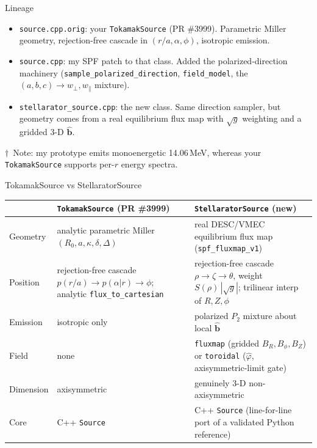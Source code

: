 \documentclass[11pt,aspectratio=169]{beamer}
\newcommand{\bhat}{\hat{\mathbf{b}}}
\newcommand{\notefoot}[1]{\vfill{\footnotesize #1\par}}
\begin{document}
\begin{frame}{Lineage}
\begin{itemize}
\item \texttt{source.cpp.orig}: your \texttt{TokamakSource} (PR \#3999). Parametric
      Miller geometry, rejection-free cascade in $(r/a,\alpha,\phi)$, isotropic emission.
\item \texttt{source.cpp}: my SPF patch to that class. Added the polarized-direction
      machinery (\texttt{sample\_polarized\_direction}, \texttt{field\_model}, the
      $(a,b,c)\!\to\!w_\perp,w_\parallel$ mixture).
\item \texttt{stellarator\_source.cpp}: the new class. Same direction sampler, but geometry
      comes from a real equilibrium flux map with $\sqrt{g}$ weighting and a gridded 3-D
      $\bhat$.
\end{itemize}
\notefoot{$\dagger$~Note: my prototype emits monoenergetic 14.06\,MeV, whereas your
\texttt{TokamakSource} supports per-$r$ energy spectra.}
\end{frame}

\begin{frame}{TokamakSource vs StellaratorSource}
\scriptsize
\begin{tabular}{@{}p{2.3cm}p{4.4cm}p{4.6cm}@{}}
\toprule
 & \texttt{TokamakSource} (PR \#3999) & \texttt{StellaratorSource} (new) \\
\midrule
Geometry & analytic parametric Miller $(R_0,a,\kappa,\delta,\Delta)$ & real DESC/VMEC
   equilibrium flux map (\texttt{spf\_fluxmap\_v1}) \\
Position & rejection-free cascade $p(r/a)\!\to\!p(\alpha|r)\!\to\!\phi$; analytic
   \texttt{flux\_to\_cartesian} & rejection-free cascade $\rho\!\to\!\zeta\!\to\!\theta$,
   weight $S(\rho)\,|\sqrt{g}|$; trilinear interp of $R,Z,\phi$ \\
Emission & isotropic only & polarized $P_2$ mixture about local $\bhat$ \\
Field & none & \texttt{fluxmap} (gridded $B_R,B_\phi,B_Z$) or \texttt{toroidal}
   ($\hat\varphi$, axisymmetric-limit gate) \\
Dimension & axisymmetric & genuinely 3-D non-axisymmetric \\
Core & C++ \texttt{Source} & C++ \texttt{Source} (line-for-line port of a validated
   Python reference) \\
\bottomrule
\end{tabular}
\end{frame}
\end{document}
